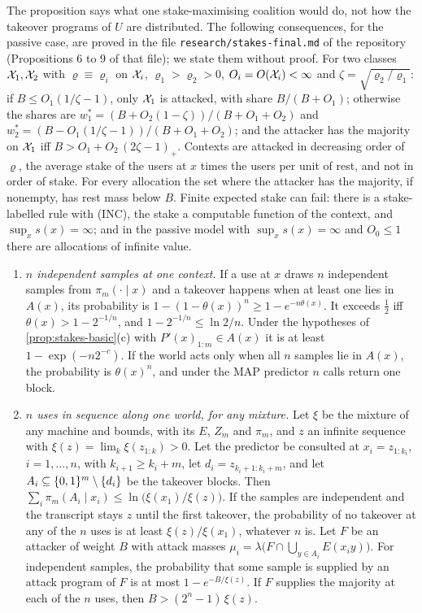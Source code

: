 The proposition says what one stake-maximising coalition would do, not how the takeover programs of $U$ are
distributed. The following consequences, for the passive case, are proved in the file
\texttt{research/stakes-final.md} of the repository (Propositions 6 to 9 of that file); we state them without
proof. For two classes $\mathcal X_1,\mathcal X_2$ with $\varrho\equiv\varrho_i$ on $\mathcal X_i$, $\varrho_1>\varrho_2>0$,
$O_i=O(\mathcal X_i)<\infty$ and $\zeta=\sqrt{\varrho_2/\varrho_1}$: if $B\le O_1(1/\zeta-1)$, only $\mathcal X_1$ is
attacked, with share $B/(B+O_1)$; otherwise the shares are $w^*_1=(B+O_2(1-\zeta))/(B+O_1+O_2)$ and
$w^*_2=(B-O_1(1/\zeta-1))/(B+O_1+O_2)$; and the attacker has the majority on $\mathcal X_1$ iff
$B>O_1+O_2\,(2\zeta-1)_+$. Contexts are attacked in decreasing order of $\varrho$, the average stake of the
users at $x$ times the users per unit of rest, and not in order of stake. For every allocation the set where
the attacker has the majority, if nonempty, has rest mass below $B$. Finite expected stake can fail: there is
a stake-labelled rule with (INC), the stake a computable function of the context, and $\sup_xs(x)=\infty$; and
in the passive model with $\sup_xs(x)=\infty$ and $O_0\le1$ there are allocations of infinite value.
\begin{proposition}\label{prop:repeat}
\begin{enumerate}[label=(\alph*),leftmargin=2em,itemsep=1pt,topsep=2pt]
\item \emph{$n$ independent samples at one context.} If a use at $x$ draws $n$ independent samples from
$\pi_m(\cdot\mid x)$ and a takeover happens when at least one lies in $A(x)$, its probability is
$1-(1-\theta(x))^n\ge1-e^{-n\theta(x)}$. It exceeds $\frac12$ iff $\theta(x)>1-2^{-1/n}$, and
$1-2^{-1/n}\le\ln2/n$. Under the hypotheses of \cref{prop:stakes-basic}(c) with $P'(x)_{1:m}\in A(x)$ it is at
least $1-\exp(-n2^{-c})$. If the world acts only when all $n$ samples lie in $A(x)$, the probability is
$\theta(x)^n$, and under the MAP predictor $n$ calls return one block.
\item \emph{$n$ uses in sequence along one world, for any mixture.} Let $\xi$ be the mixture of any machine
and bounds, with its $E$, $Z_m$ and $\pi_m$, and $z$ an infinite sequence with
$\xi(z)=\lim_k\xi(z_{1:k})>0$. Let the predictor be consulted at $x_i=z_{1:k_i}$, $i=1,\dots,n$, with
$k_{i+1}\ge k_i+m$, let $d_i=z_{k_i+1:k_i+m}$, and let $A_i\subseteq\{0,1\}^m\setminus\{d_i\}$ be the takeover
blocks. Then $\sum_{i}\pi_m(A_i\mid x_i)\le\ln\bigl(\xi(x_1)/\xi(z)\bigr)$. If the samples are independent
and the transcript stays $z$ until the first takeover, the probability of no takeover at any of the $n$ uses
is at least $\xi(z)/\xi(x_1)$, whatever $n$ is. Let $F$ be an attacker of weight $B$ with attack masses
$\mu_i=\lambda\bigl(F\cap\bigcup_{y\in A_i}E(x_iy)\bigr)$. For independent samples, the probability that
some sample is supplied by an attack program of $F$ is at most $1-e^{-B/\xi(z)}$. If $F$ supplies the
majority at each of the $n$ uses, then $B>(2^n-1)\,\xi(z)$.
\end{enumerate}\end{proposition}
